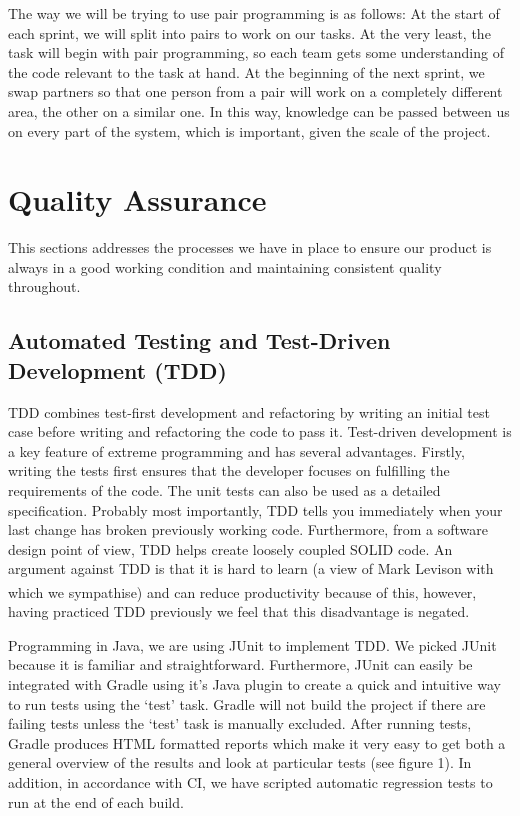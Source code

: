\documentclass[10pt, a4paper]{article}
\begin{document}
The way we will be trying to use pair programming is as follows:
At the start of each sprint, we will split into pairs to work on our tasks. At the very least, the task will begin with pair programming, so each team gets some understanding of the code relevant to the task at hand. At the beginning of the next sprint, we swap partners so that one person from a pair will work on a completely different area, the other on a similar one. In this way, knowledge can be passed between us on every part of the system, which is important, given the scale of the project.

\section{Quality Assurance}

This sections addresses the processes we have in place to ensure our product is always in a good working condition and maintaining consistent quality throughout.

\subsection{Automated Testing and Test-Driven Development (TDD)}

TDD combines test-first development and refactoring by writing an initial test case before writing and refactoring the code to pass it. Test-driven development is a key feature of extreme programming and has several advantages. Firstly, writing the tests first ensures that the developer focuses on fulfilling the requirements of the code. The unit tests can also be used as a detailed specification. Probably most importantly, TDD tells you immediately when your last change has broken previously working code. Furthermore, from a software design point of view, TDD helps create loosely coupled SOLID code. An argument against TDD is that it is hard to learn (a view of Mark Levison with which we sympathise\textsuperscript{\cite{mark}}) and can reduce productivity because of this, however, having practiced TDD previously we feel that this disadvantage is negated. 

Programming in Java, we are using JUnit to implement TDD. We picked JUnit because it is familiar and straightforward. Furthermore, JUnit can easily be integrated with Gradle using it’s Java plugin to create a quick and intuitive way to run tests using the ‘test’ task. Gradle will not build the project if there are failing tests unless the ‘test’ task is manually excluded. After running tests, Gradle produces HTML formatted reports which make it very easy to get both a general overview of the results and look at particular tests (see figure 1). In addition, in accordance with CI, we have scripted automatic regression tests to run at the end of each build.
\end{document}
